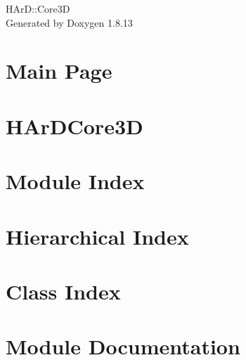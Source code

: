 \documentclass[twoside]{book}
\newcommand{\+}{\discretionary{\mbox{\scriptsize$\hookleftarrow$}}{}{}}
\newcommand{\clearemptydoublepage}{%
  \newpage{\pagestyle{empty}\cleardoublepage}%
}
\begin{document}
\hypersetup{pageanchor=false,
             bookmarksnumbered=true,
             pdfencoding=unicode
            }
\begin{titlepage}
\vspace*{7cm}
\begin{center}%
{\Large H\+ArD\+:\+:Core3D }\\
\vspace*{1cm}
{\large Generated by Doxygen 1.8.13}\\
\end{center}
\end{titlepage}
\clearemptydoublepage
{}
\tableofcontents
\clearemptydoublepage
{}
\hypersetup{pageanchor=true}

\chapter{Main Page}
\label{index}\hypertarget{index}{}
\chapter{H\+Ar\+D\+Core3D}
\label{md_README}

\chapter{Module Index}

\chapter{Hierarchical Index}

\chapter{Class Index}

\chapter{Module Documentation}







\end{document}
